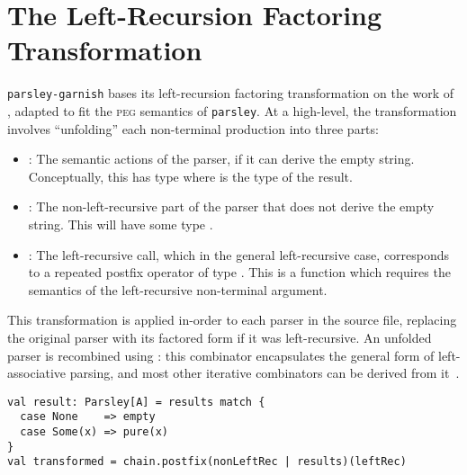 \documentclass[../../main.tex]{subfiles}
\begin{document}
\section{The Left-Recursion Factoring Transformation}
\texttt{parsley-garnish} bases its left-recursion factoring transformation on the work of \textcite{baars_leftrec_2004}, adapted to fit the \textsc{peg} semantics of \texttt{parsley}.
At a high-level, the transformation involves ``unfolding'' each non-terminal production into three parts:
\begin{itemize}
  \item {}: The semantic actions of the parser, if it can derive the empty string. Conceptually, this has type  where  is the type of the result.
  \item {}: The non-left-recursive part of the parser that does not derive the empty string. This will have some type .
  \item {}: The left-recursive call, which in the general left-recursive case, corresponds to a repeated postfix operator of type . This is a function which requires the semantics of the left-recursive non-terminal argument.
\end{itemize}
%
This transformation is applied in-order to each parser in the source file, replacing the original parser with its factored form if it was left-recursive.
An unfolded parser is recombined using : this combinator encapsulates the general form of left-associative parsing, and most other iterative combinators can be derived from it~\cite{willis_parsley_2024}.
\begin{verbatim}
val result: Parsley[A] = results match {
  case None    => empty
  case Some(x) => pure(x)
}
val transformed = chain.postfix(nonLeftRec | results)(leftRec)
\end{verbatim}
\end{document}
